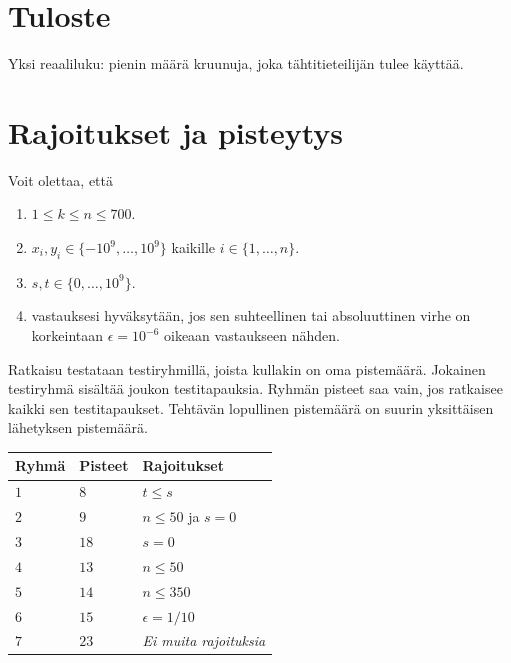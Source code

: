 \section*{Tuloste}

Yksi reaaliluku: pienin määrä kruunuja, joka tähtitieteilijän tulee käyttää.

\section*{Rajoitukset ja pisteytys} %

Voit olettaa, että
\begin{enumerate}
\item $1\leq k\leq n\leq 700$. %
\item $x_i, y_i\in \{-10^9,\ldots, 10^9\}$ kaikille $i\in\{1,\ldots,n\}$. %
\item $s,t\in \{0,\ldots, 10^9\}$. %
\item vastauksesi hyväksytään, jos sen suhteellinen tai absoluuttinen virhe on korkeintaan $\epsilon = 10^{-6}$ oikeaan vastaukseen nähden.
\end{enumerate}


Ratkaisu testataan testiryhmillä, joista kullakin on oma pistemäärä.
Jokainen testiryhmä sisältää joukon testitapauksia.
Ryhmän pisteet saa vain, jos ratkaisee kaikki sen testitapaukset.
Tehtävän lopullinen pistemäärä on suurin yksittäisen lähetyksen pistemäärä.

\medskip
\noindent
\begin{tabular}{lll}
  Ryhmä & Pisteet & Rajoitukset\\\hline
  $1$ & $8$ &  $t\leq s$\\
  $2$ & $9$ & $n\le 50$ ja $s=0$\\
  $3$ & $18$ & $s=0$\\
  $4$ & $13$ & $n\leq 50$\\
  $5$ & $14$ & $n\leq 350$\\
  $6$ & $15$ & $\epsilon = 1/10$\\
  $7$ & $23$ & \emph{Ei muita rajoituksia}\\
\end{tabular}

